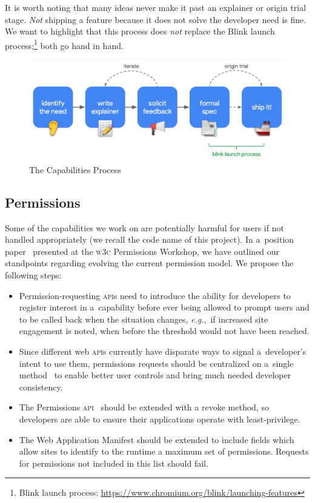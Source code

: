 \documentclass[sigconf]{acmart}
\begin{document}
It is worth noting that many ideas never make it past an explainer or origin trial stage.
\textit{Not} shipping a feature because it does not solve the developer need is fine.
We want to highlight that this process does \textit{not} replace the Blink launch
process;\footnote{Blink launch process: \url{https://www.chromium.org/blink/launching-features}}
both go hand in hand.

\begin{figure}[htb]
  \includegraphics[trim={0 0.5cm 0 0},clip,width=0.925\columnwidth]{capabilities-process.jpg}
  \caption{The Capabilities Process}
  \label{fig:fuguprocess}
  \vspace{-0.65em}
\end{figure}

\subsection{Permissions}

Some of the capabilities we work on are potentially harmful for users
if not handled appropriately (we recall the code name of this project).
In a~position paper~\cite{russell18} presented at the \textsc{w3c} Permissions Workshop,
we have outlined our standpoints regarding evolving the current permission model.
We propose the following steps:

\begin{itemize}
  \item Permission-requesting \textsc{api}s need to introduce the ability for
    developers to register interest in a~capability before ever being allowed to prompt users
    and to be called back when the situation changes, \textit{e.g.},\
    if increased site engagement is noted, when before the threshold would not have been reached.
  \item Since different web \textsc{api}s currently have disparate ways to signal
    a~developer's intent to use them, permissions requests should be centralized
    on a~single method~\cite{yasskin17} to enable
    better user controls and bring much needed developer consistency.
  \item The Permissions \textsc{api}~\cite{lamouri19} should be extended with a revoke method,
    so developers are able to ensure their applications operate with least-privilege.
  \item The Web Application Manifest should be extended to include fields
    which allow sites to identify to the runtime a maximum set of permissions.
    Requests for permissions not included in this list should fail.
\end{itemize}
\end{document}

